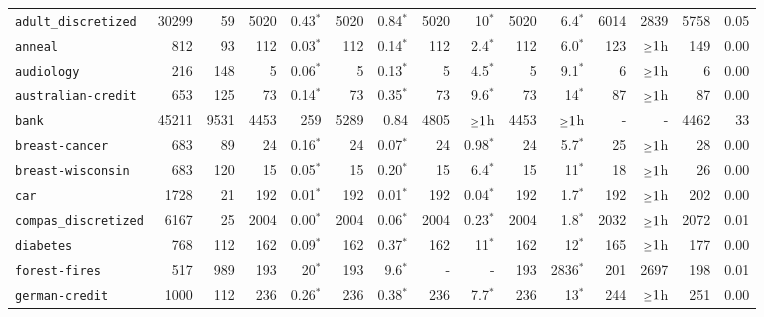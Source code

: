 \begin{tabular}{lccrrrrrrrrrrrr}
\texttt{adult\_discretized} & \multicolumn{1}{r}{30299} & \multicolumn{1}{r}{59}  & 5020 & 0.43$^*$ & 5020 & 0.84$^*$ & 5020 & 10$^*$ & 5020 & 6.4$^*$ & 6014 & 2839 & 5758 & 0.05\\
\texttt{anneal} & \multicolumn{1}{r}{812} & \multicolumn{1}{r}{93}  & 112 & 0.03$^*$ & 112 & 0.14$^*$ & 112 & 2.4$^*$ & 112 & 6.0$^*$ & 123 & $\mathsmaller{\geq}1$h & 149 & 0.00\\
\texttt{audiology} & \multicolumn{1}{r}{216} & \multicolumn{1}{r}{148}  & 5 & 0.06$^*$ & 5 & 0.13$^*$ & 5 & 4.5$^*$ & 5 & 9.1$^*$ & 6 & $\mathsmaller{\geq}1$h & 6 & 0.00\\
\texttt{australian-credit} & \multicolumn{1}{r}{653} & \multicolumn{1}{r}{125}  & 73 & 0.14$^*$ & 73 & 0.35$^*$ & 73 & 9.6$^*$ & 73 & 14$^*$ & 87 & $\mathsmaller{\geq}1$h & 87 & 0.00\\
\texttt{bank} & \multicolumn{1}{r}{45211} & \multicolumn{1}{r}{9531}  & 4453 & 259 & 5289 & 0.84 & 4805 & $\mathsmaller{\geq}1$h & 4453 & $\mathsmaller{\geq}1$h & - & - & 4462 & 33\\
\texttt{breast-cancer} & \multicolumn{1}{r}{683} & \multicolumn{1}{r}{89}  & 24 & 0.16$^*$ & 24 & 0.07$^*$ & 24 & 0.98$^*$ & 24 & 5.7$^*$ & 25 & $\mathsmaller{\geq}1$h & 28 & 0.00\\
\texttt{breast-wisconsin} & \multicolumn{1}{r}{683} & \multicolumn{1}{r}{120}  & 15 & 0.05$^*$ & 15 & 0.20$^*$ & 15 & 6.4$^*$ & 15 & 11$^*$ & 18 & $\mathsmaller{\geq}1$h & 26 & 0.00\\
\texttt{car} & \multicolumn{1}{r}{1728} & \multicolumn{1}{r}{21}  & 192 & 0.01$^*$ & 192 & 0.01$^*$ & 192 & 0.04$^*$ & 192 & 1.7$^*$ & 192 & $\mathsmaller{\geq}1$h & 202 & 0.00\\
\texttt{compas\_discretized} & \multicolumn{1}{r}{6167} & \multicolumn{1}{r}{25}  & 2004 & 0.00$^*$ & 2004 & 0.06$^*$ & 2004 & 0.23$^*$ & 2004 & 1.8$^*$ & 2032 & $\mathsmaller{\geq}1$h & 2072 & 0.01\\
\texttt{diabetes} & \multicolumn{1}{r}{768} & \multicolumn{1}{r}{112}  & 162 & 0.09$^*$ & 162 & 0.37$^*$ & 162 & 11$^*$ & 162 & 12$^*$ & 165 & $\mathsmaller{\geq}1$h & 177 & 0.00\\
\texttt{forest-fires} & \multicolumn{1}{r}{517} & \multicolumn{1}{r}{989}  & 193 & 20$^*$ & 193 & 9.6$^*$ & - & - & 193 & 2836$^*$ & 201 & 2697 & 198 & 0.01\\
\texttt{german-credit} & \multicolumn{1}{r}{1000} & \multicolumn{1}{r}{112}  & 236 & 0.26$^*$ & 236 & 0.38$^*$ & 236 & 7.7$^*$ & 236 & 13$^*$ & 244 & $\mathsmaller{\geq}1$h & 251 & 0.00\\

\end{tabular}
